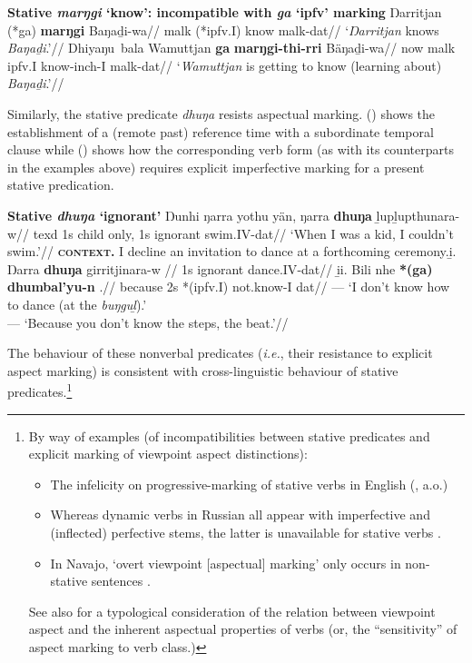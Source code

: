 \pex{}\textbf{Stative \textit{marŋgi} `know': incompatible with \textit{ga }`\gls{ipfv}' marking}
\a\begingl\gla Ŋarritjan (*ga) \textbf{marŋgi} Baŋaḏi-wa//
\glb \gls{malk} (*\gls{ipfv}.\gls{I}) know \gls{malk}-\gls{dat}//
\glft`\textit{Ŋarritjan} knows \textit{Baŋaḏi}.'\trailingcitation{[DhG~20190417]}//\endgl
\a\begingl\gla Dhiyaŋu~bala Wamuttjan \textbf{ga} \textbf{marŋgi-thi-rri} Bäŋaḏi-wa//
\glb now \gls{malk} \gls{ipfv}.\gls{I} know-\gls{inch}-\gls{I} \gls{malk}-\gls{dat}//
\glft`\textit{Wamuttjan} is getting to know (learning about) \textit{Baŋaḏi}.'\trailingcitation{[DhG~20190417]}//\endgl\xe

Similarly, the stative predicate \textit{dhuŋa} resists aspectual marking. () shows the establishment of a (remote past) reference time with a subordinate temporal clause while () shows how the corresponding verb form (as with its counterparts in the examples above) requires explicit imperfective marking for a present stative predication.


\pex{}\textbf{Stative \textit{dhuŋa} `ignorant'}
\a{}\begingl\gla Ŋunhi ŋarra yothu yän, ŋarra \textbf{dhuŋa} ḻupḻupthunara-w//
\glb\gls{texd} 1s child only, 1s ignorant swim.\gls{IV}-\gls{dat}//
\glft`When I was a kid, I couldn't swim.'\trailingcitation{[AW~20190429]}//\endgl
\a {}\textbf{\textsc{context.}} I decline an invitation to dance at a forthcoming ceremony.\beginsubsub\b{i.}\begingl \gla \nogloss{---} Ŋarra \textbf{dhuŋa} girritjinara-w //
\glb 1s ignorant dance.\gls{IV}-\gls{dat}//
\endgl
\b{ii.}\begingl\gla \nogloss{---} Bili nhe \textbf{*(ga)} \textbf{dhumbal'yu-n} .//
\glb because 2s *(\gls{ipfv}.\gls{I}) not.know-\gls{I} \gls{dat}//
\glft --- `I don't know how to dance (at the \textit{buŋguḻ}).'\\
--- `Because you don't know the steps, the beat.'\trailingcitation{[AW~20190429]}//\endgl
\endsubsub\xe


The behaviour of these nonverbal predicates (\textit{i.e.}, their resistance to explicit aspect marking) is consistent with cross-linguistic behaviour of stative predicates.\footnote{By way of examples (of incompatibilities between stative predicates and explicit marking of viewpoint aspect distinctions):\begin{itemize}\item The infelicity on progressive-marking of stative verbs in English (\citealp[e.g.][55]{Dowty1979}, \citealp[205]{Taylor1977} a.o.)
		\item Whereas dynamic verbs in Russian all appear with imperfective and (inflected) perfective stems, the latter is unavailable for stative verbs \citep[227]{Smith1997}.
		\item In Navajo, `overt viewpoint [aspectual] marking' only occurs in non-stative sentences \citep[297]{Smith1997}.\end{itemize}
	

See also \citet{Bohnemeyer2004} for a typological consideration of the relation between viewpoint aspect and the inherent aspectual properties of verbs (or, the ``sensitivity'' of aspect marking to verb class.)
}

